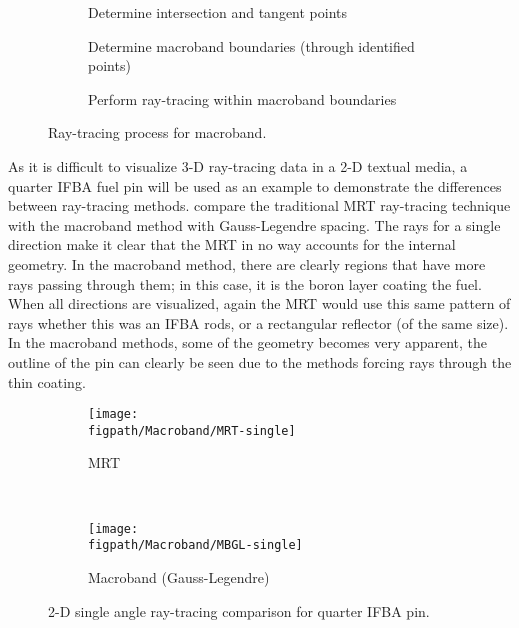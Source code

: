 {{{      \begin{figure}[ht]
        \centering
        \begin{subfigure}[t]{0.33\linewidth}
          \centering
          \def\svgwidth{0.95\linewidth}
          
          \caption{Determine intersection and tangent points}
        \end{subfigure}%
        \hfill
        \begin{subfigure}[t]{0.33\linewidth}
          \centering
          \def\svgwidth{0.95\linewidth}
          
          \caption{Determine macroband boundaries (through identified points)}
        \end{subfigure}%
        \hfill
        \begin{subfigure}[t]{0.33\linewidth}
          \centering
          \def\svgwidth{0.95\linewidth}
          
          \caption{Perform ray-tracing within macroband boundaries}
        \end{subfigure}
        \caption{Ray-tracing process for macroband.}
        \label{fig:MR:Macroband Process}
      \end{figure}

      As it is difficult to visualize 3-D ray-tracing data in a 2-D textual media, a quarter \ac{IFBA} fuel pin will be used as an example to demonstrate the differences between ray-tracing methods.
       compare the traditional \ac{MRT} ray-tracing technique with the macroband method with Gauss-Legendre spacing.
      The rays for a single direction make it clear that the \ac{MRT} in no way accounts for the internal geometry.
      In the macroband method, there are clearly regions that have more rays passing through them; in this case, it is the boron layer coating the fuel.
      When all directions are visualized, again the \ac{MRT} would use this same pattern of rays whether this was an \ac{IFBA} rods, or a rectangular reflector (of the same size).
      In the macroband methods, some of the geometry becomes very apparent, the outline of the pin can clearly be seen due to the methods forcing rays through the thin coating.

      \begin{figure}[htbp]
        \centering
        \begin{subfigure}[t]{0.33\textwidth}
          \centering
          \texttt{[image: \\figpath/Macroband/MRT-single]}
          \caption{MRT}
        \end{subfigure}%
        ~
        \begin{subfigure}[t]{0.33\textwidth}
          \centering
          \texttt{[image: \\figpath/Macroband/MBGL-single]}
          \caption{Macroband (Gauss-Legendre)}
        \end{subfigure}
        \caption{2-D single angle ray-tracing comparison for quarter IFBA pin. \label{figs:MR:Macroband-Single-Visualization}}
      \end{figure}

}}}
